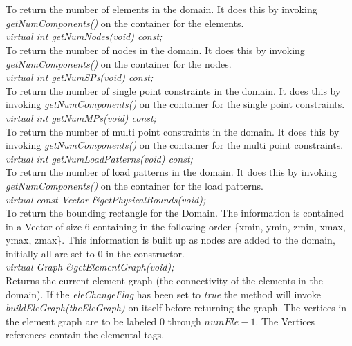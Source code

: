  \\
\\
To return the number of elements in the domain. It does this by
invoking {\em getNumComponents()} on the container for the elements. \\

{\em virtual int getNumNodes(void) const;}\\
To return the number of nodes in the domain. It does this by
invoking {\em getNumComponents()} on the container for the
nodes. \\

{\em virtual int getNumSPs(void) const;}\\
To return the number of single point constraints in the domain. It
does this by invoking {\em getNumComponents()} on the container for
the single point constraints. \\

{\em virtual int getNumMPs(void) const;}\\
To return the number of multi point constraints in the domain. It
does this by invoking {\em getNumComponents()} on the container for
the multi point constraints. \\

{\em virtual int getNumLoadPatterns(void) const;}\\
To return the number of load patterns in the domain. It
does this by invoking {\em getNumComponents()} on the container for
the load patterns. \\

{\em virtual const Vector \&getPhysicalBounds(void);} \\
To return the bounding rectangle for the Domain. The information is
contained in a Vector of size 6 containing in the following order
\{xmin, ymin, zmin, xmax, ymax, zmax\}. This information is built up
as nodes are added to the domain, initially all are set to $0$ in the
constructor. \\

{\em virtual Graph \&getElementGraph(void);} \\
Returns the current element graph (the connectivity of the elements
in the domain). If the {\em eleChangeFlag} has been set
to {\em true} the method will invoke {\em buildEleGraph(theEleGraph)}
on itself before returning the graph. The vertices in the element
graph are to be labeled $0$ through $numEle-1$. The Vertices references
contain the elemental tags. \\ 

